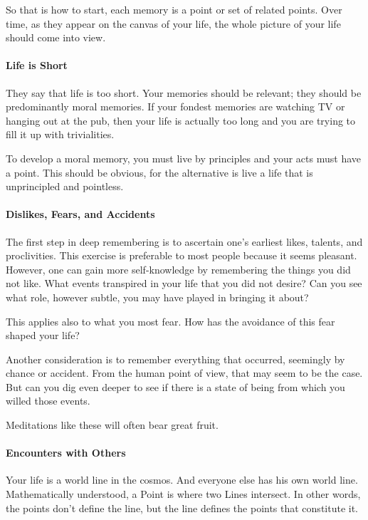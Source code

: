 So that is how to start, each memory is a point or set of related points. Over time, as they appear on the canvas of your life, the whole picture of your life should come into view.

\paragraph{Life is Short}


They say that life is too short. Your memories should be relevant; they should be predominantly moral memories. If your fondest memories are watching TV or hanging out at the pub, then your life is actually too long and you are trying to fill it up with trivialities.

To develop a moral memory, you must live by principles and your acts must have a point. This should be obvious, for the alternative is live a life that is unprincipled and pointless.

\paragraph{Dislikes, Fears, and Accidents}

The first step in deep remembering is to ascertain one's earliest likes, talents, and proclivities. This exercise is preferable to most people because it seems pleasant. However, one can gain more self-knowledge by remembering the things you did not like. What events transpired in your life that you did not desire? Can you see what role, however subtle, you may have played in bringing it about?

This applies also to what you most fear. How has the avoidance of this fear shaped your life?

Another consideration is to remember everything that occurred, seemingly by chance or accident. From the human point of view, that may seem to be the case. But can you dig even deeper to see if there is a state of being from which you willed those events.

Meditations like these will often bear great fruit.

\paragraph{Encounters with Others}


Your life is a world line in the cosmos. And everyone else has his own world line. Mathematically understood, a Point is where two Lines intersect. In other words, the points don't define the line, but the line defines the points that constitute it.

